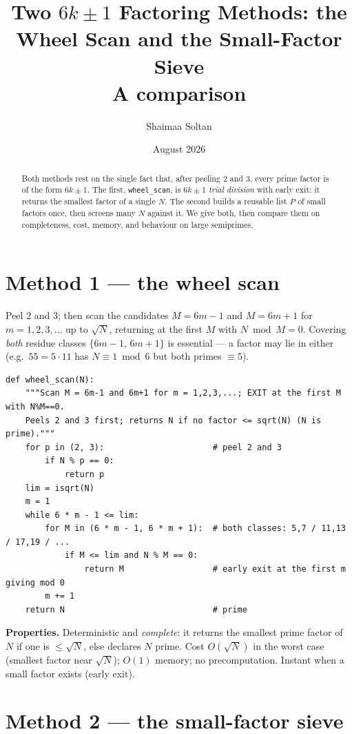 \documentclass[11pt]{article}
\title{Two $6k\pm1$ Factoring Methods: the Wheel Scan and the Small-Factor Sieve\\
\large A comparison}
\author{Shaimaa Soltan}
\date{August 2026}
\begin{document}
\maketitle

\begin{abstract}
Both methods rest on the single fact that, after peeling $2$ and $3$, every prime
factor is of the form $6k\pm1$. The first, \texttt{wheel\_scan}, is $6k\pm1$
\emph{trial division} with early exit: it returns the smallest factor of a single
$N$. The second builds a reusable list $P$ of small factors once, then screens many
$N$ against it. We give both, then compare them on completeness, cost, memory, and
behaviour on large semiprimes.
\end{abstract}

\section{Method 1 --- the wheel scan}

Peel $2$ and $3$; then scan the candidates $M=6m-1$ and $M=6m+1$ for
$m=1,2,3,\dots$ up to $\sqrt N$, returning at the first $M$ with $N\bmod M=0$.
Covering \emph{both} residue classes $\{6m-1,\,6m+1\}$ is essential --- a factor may
lie in either (e.g.\ $55=5\cdot11$ has $N\equiv1\bmod6$ but both primes
$\equiv5$).

\begin{lstlisting}
def wheel_scan(N):
    """Scan M = 6m-1 and 6m+1 for m = 1,2,3,...; EXIT at the first M with N%M==0.
    Peels 2 and 3 first; returns N if no factor <= sqrt(N) (N is prime)."""
    for p in (2, 3):                      # peel 2 and 3
        if N % p == 0:
            return p
    lim = isqrt(N)
    m = 1
    while 6 * m - 1 <= lim:
        for M in (6 * m - 1, 6 * m + 1):  # both classes: 5,7 / 11,13 / 17,19 / ...
            if M <= lim and N % M == 0:
                return M                  # early exit at the first m giving mod 0
        m += 1
    return N                              # prime
\end{lstlisting}

\noindent\textbf{Properties.} Deterministic and \emph{complete}: it returns the
smallest prime factor of $N$ if one is $\le\sqrt N$, else declares $N$ prime. Cost
$O(\sqrt N)$ in the worst case (smallest factor near $\sqrt N$); $O(1)$ memory; no
precomputation. Instant when a small factor exists (early exit).

\section{Method 2 --- the small-factor sieve}
\end{document}
